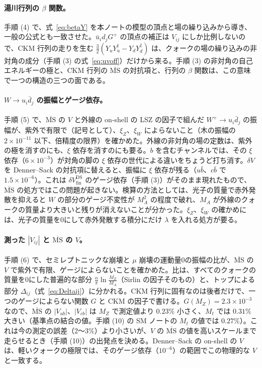 \documentclass[a4paper,10pt]{ltjsarticle}
\newcommand{\MSbar}{\overline{\mathrm{MS}}}
\begin{document}
\paragraph{湯川行列の $\beta$ 関数。}手順 (4) で、式~\eqref{eq:betaY} を本ノートの模型の頂点と場の繰り込みから導き、一般の公式とも一致させた。$\bar u_id_jG^+$ の頂点の補正は $V_{ij}$ にしか比例しないので、CKM 行列の走りを生む $\frac32(Y_uY_u^\dagger-Y_dY_d^\dagger)$ は、クォークの場の繰り込みの非対角の成分（手順 (3) の式~\eqref{eq:uvoff}）だけから来る。手順 (3) の非対角の自己エネルギーの極と、CKM 行列の $\MSbar$ の対抗項と、行列の $\beta$ 関数は、この意味で一つの構造の三つの面である。

\paragraph{$W\to u_i\bar d_j$ の振幅とゲージ依存。}手順 (5) で、$\MSbar$ の $V$ と外線の on-shell の LSZ の因子で組んだ $W^+\to u_i\bar d_j$ の振幅が、紫外で有限で（記号として）、$\xi_Z$、$\xi_W$ によらないこと（木の振幅の $2\times10^{-11}$ 以下、倍精度の限界）を確かめた。外線の非対角の場の定数は、紫外の極を消すのにも、$\xi$ 依存を消すのにも要る。$b$ を含むチャンネルでは、その $\xi$ 依存（$6\times10^{-3}$）が対角の脚の $\xi$ 依存の世代による違いをちょうど打ち消す。$\delta V$ を Denner--Sack の対抗項に替えると、振幅に $\xi$ 依存が残る（$u\bar b$、$c\bar b$ で $1.5\times10^{-6}$）。これは $\delta V^{\mathrm{DS}}_{\mathrm{fin}}$ のゲージ依存（手順 (3)）がそのまま現れたもので、$\MSbar$ の処方ではこの問題が起きない。検算の方法としては、光子の質量で赤外発散を抑えると $W$ の部分のゲージ不変性が $M_A^2$ の程度で破れ、$M_A$ が外線のクォークの質量より大きいと残りが消えないことが分かった。$\xi_Z$、$\xi_W$ の確かめには、光子の質量を0にして赤外発散する積分にだけ $\lambda$ を入れる処方が要る。

\paragraph{測った $|V_{ij}|$ と $\MSbar$ の $V$。}手順 (6) で、セミレプトニックな崩壊と $\mu$ 崩壊の運動量0の振幅の比が、$\MSbar$ の $V$ で紫外で有限、ゲージによらないことを確かめた。比は、すべてのクォークの質量を0にした普遍的な部分 $\frac\alpha\pi\ln\frac{M_Z}{M_A}$（Sirlin の因子そのもの）と、トップによる部分 $\Delta_{ij}$（式~\eqref{eq:Deltaij}）に分かれる。CKM 行列に固有なのは後者だけで、一つのゲージによらない関数 $G$ と CKM の因子で書ける。$G(M_Z)=2.3\times10^{-3}$ なので、$\MSbar$ の $|V_{ub}|$、$|V_{cb}|$ は $M_Z$ で測定値より $0.23\%$ 小さく、$M_t$ では $0.31\%$ 大きい（基準点の結合の値。手順 (10) の SM ノートの $M_t$ の値では $0.27\%$）。これは今の測定の誤差（2〜3\%）より小さいが、$V$ の $\MSbar$ の値を高いスケールまで走らせるとき（手順 (10)）の出発点を決める。Denner--Sack の on-shell の $V$ は、軽いクォークの極限では、そのゲージ依存（$10^{-6}$）の範囲でこの物理的な $V$ と一致する。
\end{document}
